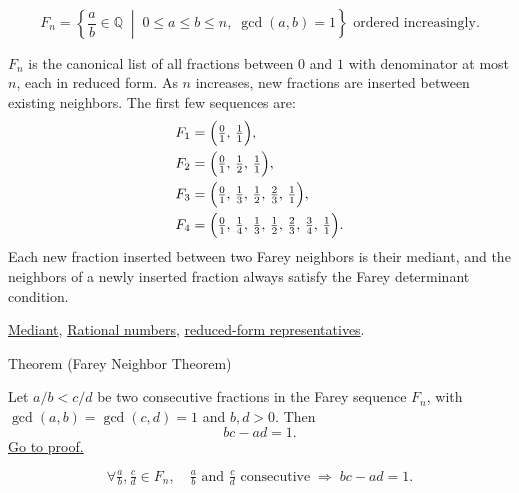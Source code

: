 \begin{remark*}
\[
F_n = \left\{ \frac{a}{b} \in \mathbb{Q} \;\middle|\;
0 \leq a \leq b \leq n,\; \gcd(a,b)=1 \right\}
\text{ ordered increasingly.}
\]
\end{remark*}

\begin{remark*}[Interpretation]
$F_n$ is the canonical list of all fractions between $0$ and $1$ with
denominator at most $n$, each in reduced form.  As $n$ increases, new
fractions are inserted between existing neighbors.  The first few sequences are:
\begin{align*}
F_1 &= \Bigl(\tfrac{0}{1},\, \tfrac{1}{1}\Bigr), \\
F_2 &= \Bigl(\tfrac{0}{1},\, \tfrac{1}{2},\, \tfrac{1}{1}\Bigr), \\
F_3 &= \Bigl(\tfrac{0}{1},\, \tfrac{1}{3},\, \tfrac{1}{2},\,
              \tfrac{2}{3},\, \tfrac{1}{1}\Bigr), \\
F_4 &= \Bigl(\tfrac{0}{1},\, \tfrac{1}{4},\, \tfrac{1}{3},\,
              \tfrac{1}{2},\, \tfrac{2}{3},\, \tfrac{3}{4},\,
              \tfrac{1}{1}\Bigr).
\end{align*}
Each new fraction inserted between two Farey neighbors is their mediant,
and the neighbors of a newly inserted fraction always satisfy the Farey
determinant condition.
\end{remark*}

\begin{dependencies}
\hyperref[def:mediant]{Mediant},
\hyperref[def:rationals]{Rational numbers},
\hyperref[thm:fraction-pair-equivalence]{reduced-form representatives}.
\end{dependencies}

\begin{theorembox}{Theorem (Farey Neighbor Theorem)}
\begin{theorem}
\label{thm:farey-neighbor-theorem}
Let $a/b < c/d$ be two consecutive fractions in the Farey sequence $F_n$,
with $\gcd(a,b) = \gcd(c,d) = 1$ and $b,d > 0$.  Then
\[
bc - ad = 1.
\]
\hyperref[prf:farey-neighbor-theorem]{Go to proof.}
\end{theorem}
\end{theorembox}

\begin{remark*}
\[
\forall \tfrac{a}{b}, \tfrac{c}{d} \in F_n,\quad
\tfrac{a}{b} \text{ and } \tfrac{c}{d} \text{ consecutive}
\;\Longrightarrow\;
bc - ad = 1.
\]
\end{remark*}

